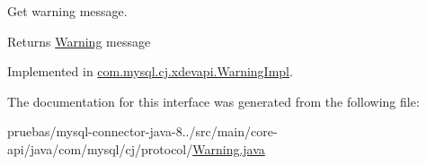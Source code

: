 Get warning message.

\begin{DoxyReturn}{Returns}
\mbox{\hyperlink{interfacecom_1_1mysql_1_1cj_1_1protocol_1_1_warning}{Warning}} message 
\end{DoxyReturn}


Implemented in \mbox{\hyperlink{classcom_1_1mysql_1_1cj_1_1xdevapi_1_1_warning_impl_afeeda25bc13726f35b4198262c46f605}{com.\+mysql.\+cj.\+xdevapi.\+Warning\+Impl}}.



The documentation for this interface was generated from the following file\+:\begin{DoxyCompactItemize}
\item 
pruebas/mysql-\/connector-\/java-\/8../src/main/core-\/api/java/com/mysql/cj/protocol/\mbox{\hyperlink{core-api_2java_2com_2mysql_2cj_2protocol_2_warning_8java}{Warning.\+java}}\end{DoxyCompactItemize}
